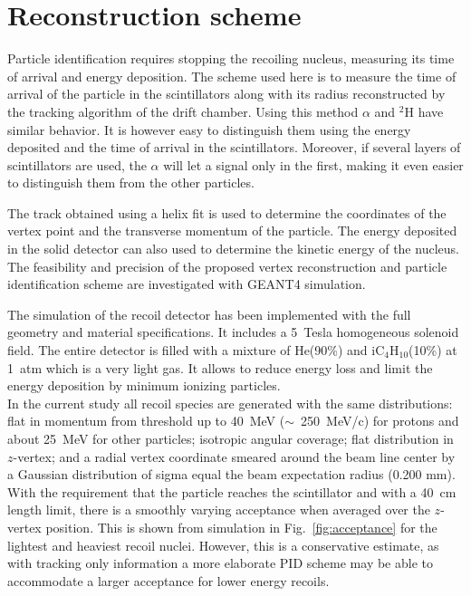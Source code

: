 \section{Reconstruction scheme} \label{sec:sim}

Particle identification requires stopping the recoiling nucleus, measuring its 
time of arrival and energy deposition. The scheme used here is to measure the 
time of arrival of the particle in the scintillators along with its radius 
reconstructed by the tracking algorithm of the drift chamber. Using this method 
$\alpha$ and $^2$H have similar behavior. It is however easy to distinguish 
them using the energy deposited and the time of arrival in the scintillators.  
Moreover, if several layers of scintillators are used, the $\alpha$ will let a 
signal only in the first, making it even easier to distinguish them from the 
other particles. 


The track obtained using a helix fit is used to determine the coordinates of 
the vertex point and the transverse momentum of the particle. The energy 
deposited in the solid detector can also used to determine the kinetic energy 
of the nucleus. The feasibility and precision of the proposed vertex 
reconstruction and particle identification scheme are investigated with GEANT4 
simulation.

The simulation of the recoil detector has been implemented with the full 
geometry and material specifications. It includes a 5~Tesla homogeneous 
solenoid field. The entire detector is filled with a mixture of He(90\%) and 
iC$_4$H$_{10}$(10\%) at 1~atm which is a very light gas. It allows to reduce 
energy loss and limit the energy deposition by minimum ionizing particles.  \\

In the current study all recoil species are generated with the same 
distributions: flat in momentum from threshold up to 40~MeV ($\sim$~250~MeV/c) 
for protons and about 25~MeV for other particles; isotropic angular coverage; 
flat distribution in $z$-vertex; and a radial vertex coordinate smeared around 
the beam line center by a Gaussian distribution of sigma equal the beam 
expectation radius (0.200 mm). \\

With the requirement that the particle reaches the scintillator and with a 
40~cm length limit, there is a smoothly varying acceptance when averaged over 
the $z$-vertex position. This is shown from simulation in 
Fig.~\ref{fig:acceptance} for the lightest and heaviest recoil nuclei. However, 
this is a conservative estimate, as with tracking only information a more 
elaborate PID scheme may be able to accommodate a larger acceptance for lower 
energy recoils.\\

